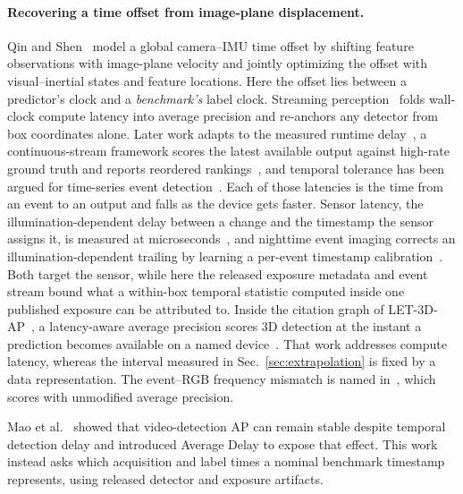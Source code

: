 \documentclass[10pt,twocolumn,letterpaper]{article}
\begin{document}
\paragraph{Recovering a time offset from image-plane displacement.} Qin and
Shen~\cite{qin2018temporal} model a global camera--IMU time offset by shifting
feature observations with image-plane velocity and jointly optimizing the offset
with visual--inertial states and feature locations. Here the offset lies between
a predictor's clock and
a \emph{benchmark's} label clock. Streaming perception~\cite{li2020streaming}
folds wall-clock compute latency into average precision and re-anchors any
detector from box coordinates alone. Later work adapts to the measured runtime
delay~\cite{yang2022streamyolo}, a continuous-stream framework scores the latest
available output against high-rate ground truth and reports reordered
rankings~\cite{chu2026stare}, and temporal tolerance has been argued for
time-series event detection~\cite{softed2024}. Each of those latencies is the
time from an event to an output and falls as the device gets faster. Sensor
latency, the illumination-dependent delay between a change and the timestamp the
sensor assigns it, is measured at
microseconds~\cite{yang2024latency}, and nighttime event imaging corrects an
illumination-dependent trailing by learning a per-event timestamp
calibration~\cite{liu2024nighttime}. Both target the sensor, while here the
released exposure metadata and event stream bound what a within-box temporal
statistic computed inside one published exposure can be attributed to. Inside
the citation graph of LET-3D-AP~\cite{hung2022let}, a latency-aware average
precision scores 3D detection at the instant a prediction becomes available on
a named device~\cite{rethink3d2025}. That work addresses compute latency,
whereas the interval measured in Sec.~\ref{sec:extrapolation} is fixed by a data representation. The
event--RGB frequency mismatch is named in~\cite{faod2024}, which scores with
unmodified average precision.

Mao et al.~\cite{mao2019delay} showed that video-detection AP can remain stable
despite temporal detection delay and introduced Average Delay to expose that
effect. This work instead asks which acquisition and label times a nominal benchmark
timestamp represents, using released detector and exposure artifacts.
\end{document}
